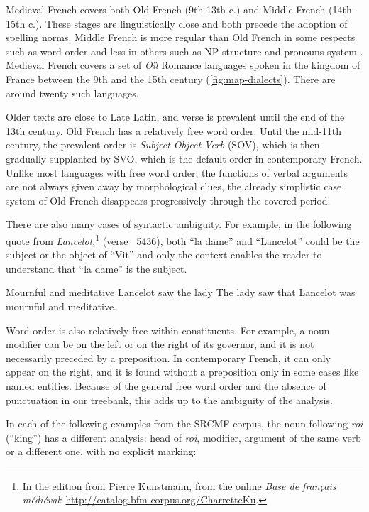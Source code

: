 Medieval French covers both Old French (9th-13th c.) and Middle French (14th-15th c.). These stages are linguistically close and both precede the adoption of spelling norms. Middle French is more regular than Old French in some respects such as word order \citep{marchello-Nizia-etal-2020-grande} and less in others such as NP structure and pronouns system \citep{marchello-nizia-etal-1979-histoire}. Medieval French covers a set of \textit{Oïl} Romance languages spoken in the kingdom of France between the 9th and the 15th century (\cref{fig:map-dialects}).
There are around twenty such languages.

Older texts are close to Late Latin, and verse is prevalent until the end of the 13th century. Old French has a relatively free word order.
Until the mid-11th century, the prevalent order is \textit{Subject-Object-Verb} (SOV), which is then gradually supplanted by SVO, which is the default order in contemporary French. Unlike most languages with free word order, the functions of verbal arguments are not always given away by morphological clues, the already simplistic case system of Old French disappears progressively through the covered period.

There are also many cases of syntactic ambiguity. For example, in the following quote from \emph{Lancelot},\footnote{In the edition from Pierre Kunstmann, from the online \textit{Base de français médiéval}: \url{http://catalog.bfm-corpus.org/CharretteKu}.} (verse ~5436),
both \enquote{la dame} and \enquote{Lancelot} could be the subject or the object of \enquote{Vit} and only the context enables the reader to understand that \enquote{la dame} is the subject.

{Mournful and meditative Lancelot saw the lady}
{The lady saw that Lancelot was mournful and meditative.}

Word order is also relatively free within constituents. For example, a noun modifier can be on the left or on the right of its governor, and it is not necessarily preceded by a preposition. In contemporary French, it can only appear on the right, and it is found without a preposition only in some cases like named entities. Because of the general free word order and the absence of punctuation in our treebank, this adds up to the ambiguity of the analysis.

In each of the following examples from the SRCMF corpus, the noun following \emph{roi} (\enquote{king}) has a different analysis: head of \emph{roi}, modifier, argument of the same verb or a different one, with no explicit marking:


